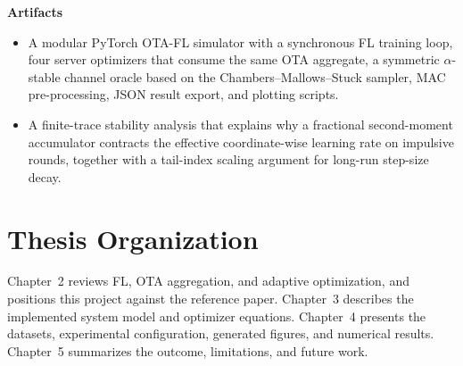\noindent\textbf{Artifacts}
\begin{itemize}
    \item A modular PyTorch OTA-FL simulator with a synchronous
    FL training loop, four server optimizers that consume the same
    OTA aggregate, a symmetric $\alpha$-stable channel oracle based on
    the Chambers--Mallows--Stuck sampler, MAC pre-processing, JSON
    result export, and plotting scripts.
    \item A finite-trace stability analysis that explains why a
    fractional second-moment accumulator contracts the effective
    coordinate-wise learning rate on impulsive rounds, together with a
    tail-index scaling argument for long-run step-size decay.
\end{itemize}

\section{Thesis Organization}
Chapter~2 reviews FL, OTA aggregation, and adaptive optimization,
and positions this project against the reference paper. Chapter~3
describes the implemented system model and optimizer equations.
Chapter~4 presents the datasets, experimental configuration, generated
figures, and numerical results. Chapter~5 summarizes the outcome,
limitations, and future work.
